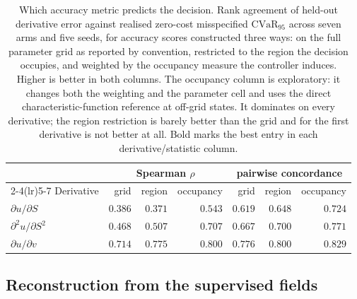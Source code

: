 \documentclass{article}
\begin{document}
\begin{table}[!htbp]
\caption{Which accuracy metric predicts the decision. Rank agreement of held-out
derivative error against realised zero-cost misspecified $\mathrm{CVaR}_{95}$ across
seven arms and five seeds, for accuracy scores constructed three ways: on the full
parameter grid as reported by convention, restricted to the region the decision
occupies, and weighted by the occupancy measure the controller induces. Higher is
better in both columns. The occupancy column is exploratory: it changes both the
weighting and the parameter cell and uses the direct characteristic-function
reference at off-grid states. It dominates on every derivative; the region
restriction is barely better than the grid and for the first derivative is not
better at all. Bold marks the best entry in each derivative/statistic column.}
\label{tab:metric}
\centering\footnotesize\setlength{\tabcolsep}{6pt}
\begin{tabular}{@{}lrrrrrr@{}}
\toprule
& \multicolumn{3}{c}{Spearman $\rho$} & \multicolumn{3}{c}{pairwise concordance} \\
\cmidrule(lr){2-4}\cmidrule(lr){5-7}
Derivative & grid & region & occupancy & grid & region & occupancy \\
\midrule
$\partial u/\partial S$ & $0.386$ & $0.371$ & $\mathbf{0.543}$ & $0.619$ & $0.648$ & $\mathbf{0.724}$ \\
$\partial^{2}u/\partial S^{2}$ & $0.468$ & $0.507$ & $\mathbf{0.707}$ & $0.667$ & $0.700$ & $\mathbf{0.771}$ \\
$\partial u/\partial v$ & $0.714$ & $0.775$ & $\mathbf{0.800}$ & $0.776$ & $0.800$ & $\mathbf{0.829}$ \\
\bottomrule
\end{tabular}
\end{table}

\subsection{Reconstruction from the supervised fields}
\label{sec:mvbuild}
\end{document}
